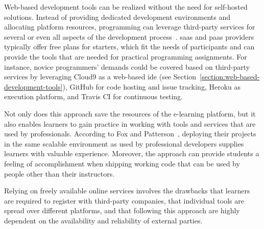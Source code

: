Web-based development tools can be realized without the need for self-hosted solutions. Instead of providing dedicated development environments and allocating platform resources, programming \moocs can leverage third-party services for several or even all aspects of the development process~\cite{fox2012crossing,staubitz2014lightweight}. \Gls{saas} and \gls{paas} providers typically offer free plans for starters, which fit the needs of \mooc participants and can provide the tools that are needed for practical programming assignments. For instance, novice programmers' demands could be covered based on third-party services by leveraging Cloud9 as a web-based \gls{ide} (see Section~\ref{section:web-based-development-tools}), GitHub for code hosting and issue tracking, Heroku as execution platform, and Travis CI for continuous testing.

Not only does this approach save the resources of the e-learning platform, but it also enables learners to gain practice in working with tools and services that are used by professionals. According to Fox and Patterson~\cite{fox2012crossing}, deploying their projects in the same scalable environment as used by professional developers supplies learners with valuable experience. Moreover, the approach can provide students a feeling of accomplishment when shipping working code that can be used by people other than their instructors.

Relying on freely available online services involves the drawbacks that learners are required to register with third-party companies, that individual tools are spread over different platforms, and that \moocs following this approach are highly dependent on the availability and reliability of external parties.
